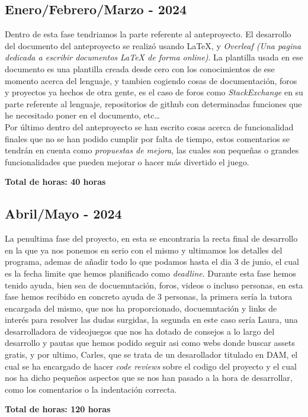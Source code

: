 \documentclass[a4paper]{article}
\begin{document}
\subsection{Enero/Febrero/Marzo - 2024}
Dentro de esta fase tendriamos la parte referente al anteproyecto. El desarrollo del documento del anteproyecto se realizó usando \LaTeX, y \textit{Overleaf (Una pagina dedicada a escribir documentos LaTeX de forma online)}. La plantilla usada en ese documento es una plantilla creada desde cero con los conocimientos de ese momento acerca del lenguaje, y tambien cogiendo cosas de documentación, foros y proyectos ya hechos de otra gente, es el caso de foros como \textit{StackExchange} en su parte referente al lenguaje, repositorios de github con determinadas funciones que he necesitado poner en el documento, etc\dots \\
Por último dentro del anteproyecto se han escrito cosas acerca de funcionalidad finales que no se han podido cumplir por falta de tiempo, estos comentarios se tendrán en cuenta como \textit{propuestas de mejora}, las cuales son pequeñas o grandes funcionalidades que pueden mejorar o hacer más divertido el juego.
\begin{flushright}
    \bf Total de horas: 40 horas
\end{flushright}

\clearpage
\subsection{Abril/Mayo - 2024}
La penultima fase del proyecto, en esta se encontraria la recta final de desarrollo en la que ya nos ponemos en serio con el mismo y ultimamos los detalles del programa, ademas de añadir todo lo que podamos hasta el dia 3 de junio, el cual es la fecha limite que hemos planificado como \textit{deadline}. Durante esta fase hemos tenido ayuda, bien sea de docuemntación, foros, videos o incluso personas, en esta fase hemos recibido en concreto ayuda de 3 personas, la primera sería la tutora encargada del mismo, que nos ha proporcionado, docuemntación y links de interés para resolver las dudas surgidas, la segunda en este caso sería Laura, una desarrolladora de videojuegos que nos ha dotado de consejos a lo largo del desarrollo y pautas que hemos podido seguir asi como webs donde buscar assets gratis, y por ultimo, Carles, que se trata de un desarollador titulado en DAM, el cual se ha encargado de hacer \textit{code reviews} sobre el codigo del proyecto y el cual nos ha dicho pequeños aspectos que se nos han pasado a la hora de desarrollar, como los comentarios o la indentación correcta.
\begin{flushright}
    \bf Total de horas: 120 horas
\end{flushright}
\end{document}
